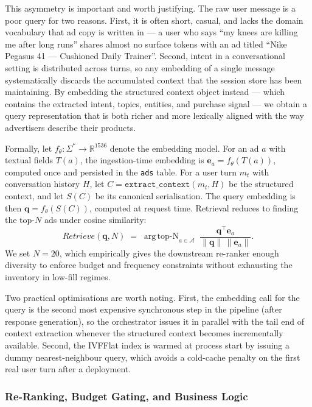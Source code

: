 This asymmetry is important and worth justifying. The raw user message is a
poor query for two reasons. First, it is often short, casual, and lacks the
domain vocabulary that ad copy is written in --- a user who says ``my knees
are killing me after long runs'' shares almost no surface tokens with an ad
titled ``Nike Pegasus 41 --- Cushioned Daily Trainer''. Second, intent in a
conversational setting is distributed across turns, so any embedding of a
single message systematically discards the accumulated context that the
session store has been maintaining. By embedding the structured context
object instead --- which contains the extracted intent, topics, entities, and
purchase signal --- we obtain a query representation that is both richer and
more lexically aligned with the way advertisers describe their products.

Formally, let $f_\theta : \Sigma^* \to \mathbb{R}^{1536}$ denote the
embedding model. For an ad $a$ with textual fields $T(a)$, the ingestion-time
embedding is $\mathbf{e}_a = f_\theta(T(a))$, computed once and persisted in
the \texttt{ads} table. For a user turn $m_t$ with conversation history $H$,
let $C = \texttt{extract\_context}(m_t, H)$ be the structured context, and
let $S(C)$ be its canonical serialisation. The query embedding is then
$\mathbf{q} = f_\theta(S(C))$, computed at request time. Retrieval reduces to
finding the top-$N$ ads under cosine similarity:
\[
    \mathit{Retrieve}(\mathbf{q}, N) \;=\;
    \mathop{\mathrm{arg\,top}\text{-}N}_{a \in \mathcal{A}}\;
    \frac{\mathbf{q}^\top \mathbf{e}_a}{\lVert \mathbf{q}\rVert\,\lVert \mathbf{e}_a\rVert}.
\]
We set $N = 20$, which empirically gives the downstream re-ranker enough
diversity to enforce budget and frequency constraints without exhausting the
inventory in low-fill regimes.

Two practical optimisations are worth noting. First, the embedding call for
the query is the second most expensive synchronous step in the pipeline
(after response generation), so the orchestrator issues it in parallel with
the tail end of context extraction whenever the structured context becomes
incrementally available. Second, the IVFFlat index is warmed at process
start by issuing a dummy nearest-neighbour query, which avoids a cold-cache
penalty on the first real user turn after a deployment.

\subsubsection{Re-Ranking, Budget Gating, and Business Logic}
\label{subsubsec:reranking-business-logic}

